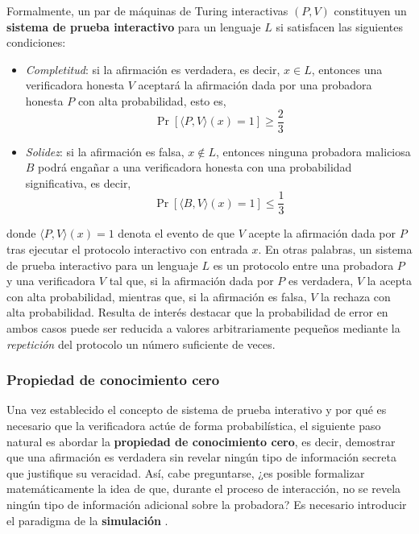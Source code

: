 \documentclass[a4paper, 11pt]{article}
\begin{document}
Formalmente, un par de máquinas de Turing interactivas $\left(P, V\right)$ constituyen un
\textbf{sistema de prueba interactivo} para un lenguaje $L$ si satisfacen las siguientes condiciones:
\begin{itemize}
  \item \textit{Completitud}: si la afirmación es verdadera, es decir, $x \in L$, entonces una
        verificadora honesta $V$ aceptará la afirmación dada por una probadora honesta $P$ con alta
        probabilidad, esto es,
        \begin{equation}
          \Pr[\langle P, V \rangle(x) = 1] \geq \frac{2}{3} \label{completitud}
        \end{equation}
  \item \textit{Solidez}: si la afirmación es falsa, $x \notin L$, entonces ninguna probadora
        maliciosa $B$ podrá engañar a una verificadora honesta con una probabilidad significativa,
        es decir,
        \begin{equation}
          \Pr[\langle B, V \rangle(x) = 1] \leq \frac{1}{3} \label{solidez}
        \end{equation}
\end{itemize}
donde $\langle P, V \rangle(x) = 1$ denota el evento de que $V$ acepte la afirmación dada por $P$
tras ejecutar el protocolo interactivo con entrada $x$. En otras palabras, un sistema de prueba
interactivo para un lenguaje $L$ es un protocolo entre una probadora $P$ y una verificadora $V$ tal
que, si la afirmación dada por $P$ es verdadera, $V$ la acepta con alta probabilidad, mientras que,
si la afirmación es falsa, $V$ la rechaza con alta probabilidad. Resulta de interés destacar que
la probabilidad de error en ambos casos puede ser reducida a valores arbitrariamente pequeños mediante
la \textit{repetición} del protocolo un número suficiente de veces.

\subsubsection{Propiedad de conocimiento cero} \label{zk_conocimiento_cero}

Una vez establecido el concepto de sistema de prueba interativo y por qué es necesario que la
verificadora actúe de forma probabilística, el siguiente paso natural es abordar la
\textbf{propiedad de conocimiento cero}, es decir, demostrar que una afirmación es verdadera sin
revelar ningún tipo de información secreta que justifique su veracidad. Así, cabe preguntarse, ¿es
posible formalizar matemáticamente la idea de que, durante el proceso de interacción, no se revela
ningún tipo de información adicional sobre la probadora? Es necesario introducir el paradigma de la
\textbf{simulación} \cite[Capítulo~4]{goldreich2001foundations}.
\end{document}
